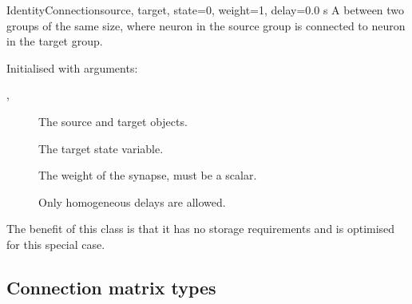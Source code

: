 \documentclass[letterpaper,10pt,english]{manual}
\begin{document}
\hypertarget{brian.IdentityConnection}{}\begin{classdesc}{IdentityConnection}{source, target, state=0, weight=1, delay=0.0 s}
A \hyperlink{brian.Connection}{} between two groups of the same size, where neuron  in the
source group is connected to neuron  in the target group.

Initialised with arguments:
\begin{description}
\item[, ]
The source and target \hyperlink{brian.NeuronGroup}{} objects.

\item[]
The target state variable.

\item[]
The weight of the synapse, must be a scalar.

\item[]
Only homogeneous delays are allowed.

\end{description}

The benefit of this class is that it has no storage requirements and is optimised for
this special case.
\end{classdesc}

\hypertarget{index-79}{}\subsection{Connection matrix types}
\end{document}
